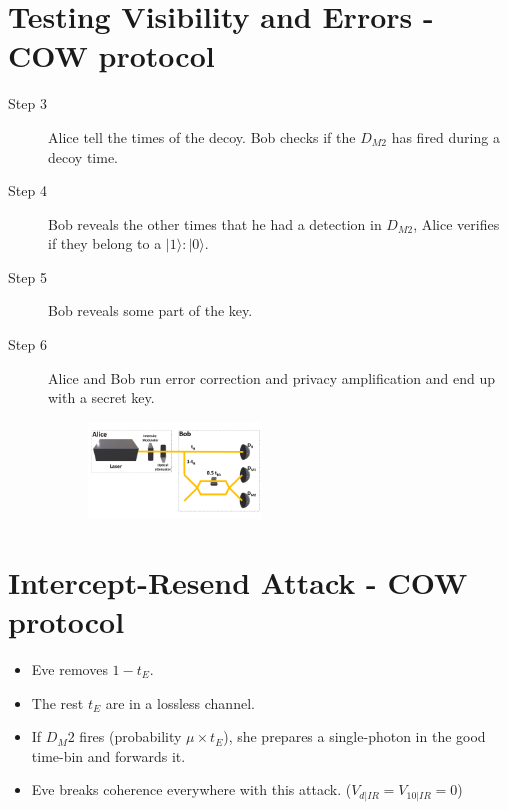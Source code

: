 \documentclass[1000pt]{article}
\newcommand{\mysection}[1]{\section*{\color{black}\sffamily #1}}%
\begin{document}

\mysection{\Huge\textbf{Testing Visibility and Errors - COW protocol}} \Large \vspace*{1cm}
\begin{description}

\item [Step 3] Alice tell the times of the decoy. Bob checks if the $D_{M2}$ has fired during a decoy time.

\item [Step 4] Bob reveals the other times that he had a detection in $D_{M2}$, Alice verifies if they belong to a $|1\rangle:|0\rangle$.

\item [Step 5] Bob reveals some part of the key. 

\item [Step 6] Alice and Bob run error correction and privacy amplification and end up with a secret key.

\begin{figure}[hbt]
    	\centering
    	\includegraphics[width=0.45\textwidth]{./figures/Full2.pdf}
    \end{figure}
\end{description}
\iffalse

\mysection{\Huge\textbf{Intercept-Resend Attack - COW protocol}} \large \vspace*{1cm}
\begin{itemize}
	\item Eve removes $1-t_E$.
	\item The rest $t_E$ are in a lossless channel.
	\item If $D_M2$ fires (probability $\mu \times t_E$), she prepares a single-photon in the good time-bin and forwards it.
	\item Eve breaks coherence everywhere with this attack. ($V_{d|IR} = V_{10|IR} =0$)
\end{itemize}
\end{document}
